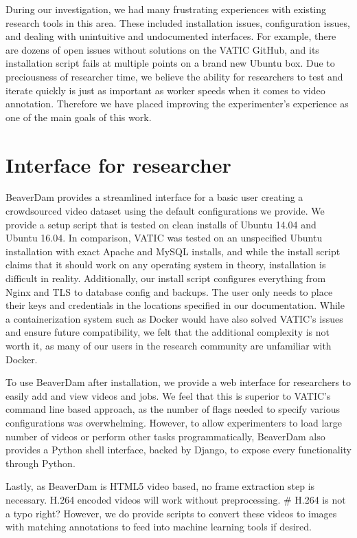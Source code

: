 
During our investigation, we had many frustrating experiences with existing research tools in this area.
These included installation issues, configuration issues, and dealing with unintuitive and undocumented interfaces.
For example, there are dozens of open issues without solutions on the VATIC GitHub,
and its installation script fails at multiple points on a brand new Ubuntu box.
Due to preciousness of researcher time,
we believe the ability for researchers to test and iterate quickly is just as important as worker speeds when it comes to video annotation.
Therefore we have placed improving the experimenter's experience as one of the main goals of this work.

\section{Interface for researcher}

BeaverDam provides a streamlined interface for a basic user creating a crowdsourced video dataset using the default configurations we provide.
We provide a setup script that is tested on clean installs of Ubuntu 14.04 and Ubuntu 16.04.
In comparison, VATIC was tested on an unspecified Ubuntu installation with exact Apache and MySQL installs,
and while the install script claims that it should work on any operating system in theory,
installation is difficult in reality.
Additionally, our install script configures everything from Nginx and TLS to database config and backups.
The user only needs to place their keys and credentials in the locations specified in our documentation.
While a containerization system such as Docker would have also solved VATIC's issues and ensure future compatibility,
we felt that the additional complexity is not worth it, as many of our users in the research community are unfamiliar with Docker.

To use BeaverDam after installation, we provide a web interface for researchers to easily add and view videos and jobs.
We feel that this is superior to VATIC's command line based approach,
as the number of flags needed to specify various configurations was overwhelming.
However, to allow experimenters to load large number of videos or perform other tasks programmatically,
BeaverDam also provides a Python shell interface, backed by Django, to expose every functionality through Python.

Lastly, as BeaverDam is HTML5 video based, no frame extraction step is necessary.
H.264 encoded videos will work without preprocessing. # H.264 is not a typo right?
However, we do provide scripts to convert these videos to images with matching annotations to feed into machine learning tools if desired.

